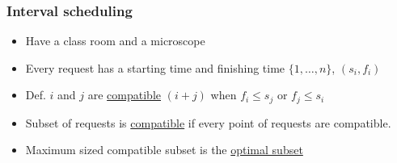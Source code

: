 \documentclass[11pt]{article}
\begin{document}
\subsubsection{Interval scheduling}
\label{sec:org8c9eabd}
\begin{itemize}
\item Have a class room and a microscope
\item Every request has a starting time and finishing time \(\{1,\ldots, n\}\), \((s_i,f_i)\)
\item Def. \(i\) and \(j\) are \uline{compatible} \((i+j)\) when \(f_i \leq s_j\) or \(f_j \leq s_i\)
\item Subset of requests is \uline{compatible} if every point of requests are compatible.
\item Maximum sized compatible subset is the \uline{optimal subset}
\end{itemize}
\end{document}

